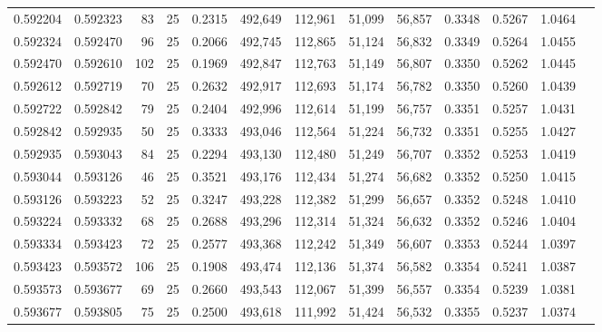 \begin{tabular}{rrrrrrrrrrrrr}
0.592204 & 0.592323 &    83 &  25 &                                     0.2315 & 492,649 & 112,961 &  51,099 &  56,857 & 0.3348 & 0.5267 & 1.0464 \\
0.592324 & 0.592470 &    96 &  25 &                                     0.2066 & 492,745 & 112,865 &  51,124 &  56,832 & 0.3349 & 0.5264 & 1.0455 \\
0.592470 & 0.592610 &   102 &  25 &                                     0.1969 & 492,847 & 112,763 &  51,149 &  56,807 & 0.3350 & 0.5262 & 1.0445 \\
0.592612 & 0.592719 &    70 &  25 &                                     0.2632 & 492,917 & 112,693 &  51,174 &  56,782 & 0.3350 & 0.5260 & 1.0439 \\
0.592722 & 0.592842 &    79 &  25 &                                     0.2404 & 492,996 & 112,614 &  51,199 &  56,757 & 0.3351 & 0.5257 & 1.0431 \\
0.592842 & 0.592935 &    50 &  25 &                                     0.3333 & 493,046 & 112,564 &  51,224 &  56,732 & 0.3351 & 0.5255 & 1.0427 \\
0.592935 & 0.593043 &    84 &  25 &                                     0.2294 & 493,130 & 112,480 &  51,249 &  56,707 & 0.3352 & 0.5253 & 1.0419 \\
0.593044 & 0.593126 &    46 &  25 &                                     0.3521 & 493,176 & 112,434 &  51,274 &  56,682 & 0.3352 & 0.5250 & 1.0415 \\
0.593126 & 0.593223 &    52 &  25 &                                     0.3247 & 493,228 & 112,382 &  51,299 &  56,657 & 0.3352 & 0.5248 & 1.0410 \\
0.593224 & 0.593332 &    68 &  25 &                                     0.2688 & 493,296 & 112,314 &  51,324 &  56,632 & 0.3352 & 0.5246 & 1.0404 \\
0.593334 & 0.593423 &    72 &  25 &                                     0.2577 & 493,368 & 112,242 &  51,349 &  56,607 & 0.3353 & 0.5244 & 1.0397 \\
0.593423 & 0.593572 &   106 &  25 &                                     0.1908 & 493,474 & 112,136 &  51,374 &  56,582 & 0.3354 & 0.5241 & 1.0387 \\
0.593573 & 0.593677 &    69 &  25 &                                     0.2660 & 493,543 & 112,067 &  51,399 &  56,557 & 0.3354 & 0.5239 & 1.0381 \\
0.593677 & 0.593805 &    75 &  25 &                                     0.2500 & 493,618 & 111,992 &  51,424 &  56,532 & 0.3355 & 0.5237 & 1.0374 \\

\end{tabular}
